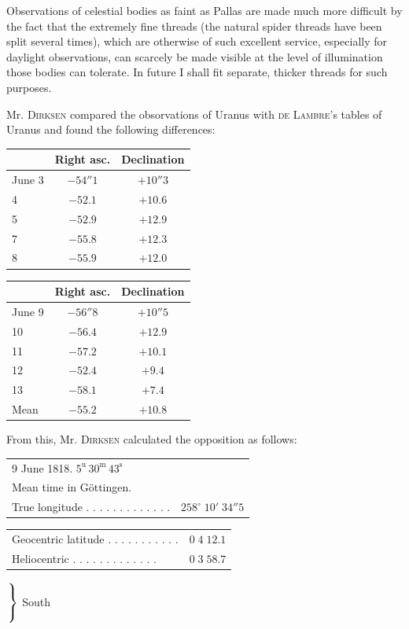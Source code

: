 \par\indent Observations of celestial bodies as faint as Pallas are made much more difficult by the fact that the extremely fine threads (the natural spider threads have been split several times), which are otherwise of such excellent service, especially for daylight observations, can scarcely be made visible at the level of illumination those bodies can tolerate. In future I shall fit separate, thicker threads for such purposes.

\par\indent Mr. \textsc{Dirksen} compared the obsorvations of Uranus with \textsc{de Lambre}’s tables of Uranus and found the following differences: 

\begin{center}
\begin{tabular}{l|c|c}
 & Right asc. & Declination \\
\hline
June 3 & $-54''1$ & $+10''3$ \\
4 & $-52.1$ & $+10.6$ \\
5 & $-52.9$ & $+12.9$ \\
7 & $-55.8$ & $+12.3$ \\
8 & $-55.9$ & $+12.0$ \\
\end{tabular}
\par\medskip
\begin{tabular}{l|c|c}
 & Right asc. & Declination \\
\hline
June 9 & $-56''8$ & $+10''5$ \\
10 & $-56.4$ & $+12.9$ \\
11 & $-57.2$ & $+10.1$ \\
12 & $-52.4$ & $+9.4$ \\
13 & $-58.1$ & $+7.4$ \\
Mean & $-55.2$ & $+10.8$ \\
\end{tabular}
\end{center}

\par\indent From this, Mr. \textsc{Dirksen} calculated the opposition as follows:

\begin{center}
\begin{tabular}{ll}
\multicolumn{2}{l}{9 June 1818. $5^{\mathrm u}\,30^{\mathrm m}\,43^{\mathrm s}$} \\
\multicolumn{2}{l}{Mean time in Göttingen.} \\
True longitude . . . . . . . . . . . . . & $258^\circ\;10'\;34''5$ \\
\end{tabular}\par\smallskip
\begin{tabular}{ll}
Geocentric latitude . . . . . . . . . . . & $0\;4\;12.1$ \\
Heliocentric . . . . . . . . . . . . . & $0\;3\;58.7$ \\
\end{tabular} $\left.\rule{0pt}{2.2em}\right\}$ South
\end{center}


